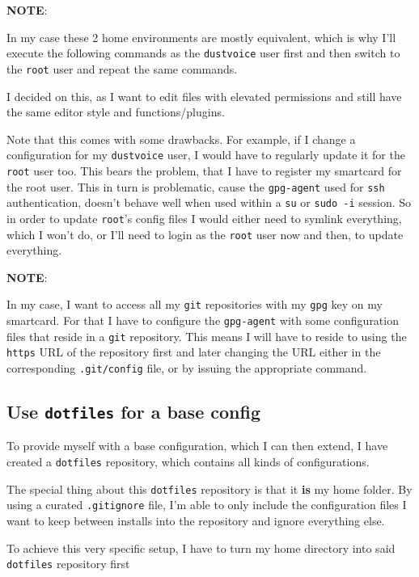 \documentclass[9pt]{report}
\newcommand{\admonition}[2]{\textbf{#1}: {#2}}
\begin{document}
\admonition{NOTE}{In my case these 2 home environments are mostly equivalent, which is why I’ll execute the following commands as the \texttt{dustvoice} user first and then switch to the \texttt{root} user and repeat the same commands.


I decided on this, as I want to edit files with elevated permissions and still have the same editor style and functions/plugins.


Note that this comes with some drawbacks.
For example, if I change a configuration for my \texttt{dustvoice} user, I would have to regularly update it for the \texttt{root} user too.
This bears the problem, that I have to register my smartcard for the root user.
This in turn is problematic, cause the \texttt{gpg-agent} used for \texttt{ssh} authentication, doesn’t behave well when used within a \texttt{su} or \texttt{sudo -i} session.
So in order to update \texttt{root}'s config files I would either need to symlink everything, which I won’t do, or I’ll need to login as the \texttt{root} user now and then, to update everything.

}
\admonition{NOTE}{In my case, I want to access all my \texttt{git} repositories with my \texttt{gpg} key on my smartcard.
For that I have to configure the \texttt{gpg-agent} with some configuration files that reside in a \texttt{git} repository.
This means I will have to reside to using the \texttt{https} URL of the repository first and later changing the URL either in the corresponding \texttt{.git/config} file, or by issuing the appropriate command.

}

\vfill\eject

\hypertarget{x-use-dotfiles-for-a-base-config}{\subsection{Use \texttt{dotfiles} for a base config}}
To provide myself with a base configuration, which I can then extend, I have created a \texttt{dotfiles} repository, which contains all kinds of configurations.


The special thing about this \texttt{dotfiles} repository is that it \textbf{is} my home folder.
By using a curated \texttt{.gitignore} file, I’m able to only include the configuration files I want to keep between installs into the repository and ignore everything else.


To achieve this very specific setup, I have to turn my home directory into said \texttt{dotfiles} repository first
\end{document}
